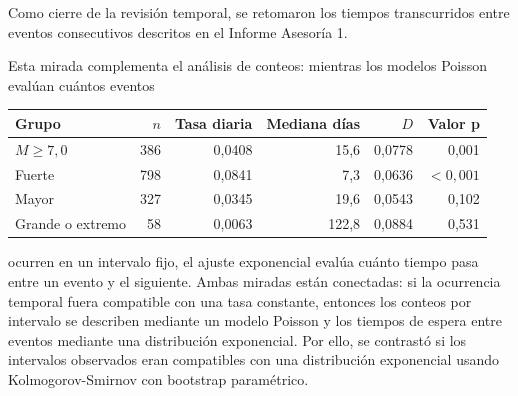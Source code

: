 \documentclass[
  spanish,
  letterpaper,
  DIV=11,
  numbers=noendperiod]{scrartcl}
\begin{document}
\noindent
\begin{minipage}[t]{0.45\textwidth}
\vspace{0pt}
Como cierre de la revisión temporal, se retomaron los tiempos transcurridos entre eventos consecutivos descritos en el Informe Asesoría 1.

Esta mirada complementa el análisis de conteos: mientras los modelos Poisson evalúan cuántos eventos
\end{minipage}\hfill
\begin{minipage}[t]{0.51\textwidth}
\vspace{0pt}
\begingroup
\scriptsize
\centering
\setlength{\tabcolsep}{1.8pt}
\renewcommand{\arraystretch}{0.82}
{}
\label{tbl-temporal-exponencial}
\hypertarget{dest-tbl-temporal-exponencial}{}
\begin{tabular*}{\linewidth}{@{\extracolsep{\fill}}lrrrrr@{}}
\toprule
Grupo & $n$ & Tasa diaria & Mediana días & $D$ & Valor p \\
\midrule
$M \geq 7{,}0$ & 386 & 0,0408 & 15,6 & 0,0778 & 0,001 \\
Fuerte & 798 & 0,0841 & 7,3 & 0,0636 & $<0{,}001$ \\
Mayor & 327 & 0,0345 & 19,6 & 0,0543 & 0,102 \\
Grande o extremo & 58 & 0,0063 & 122,8 & 0,0884 & 0,531 \\
\bottomrule
\end{tabular*}
\par\vspace{0.10em}
\endgroup
\end{minipage}
\par\vspace{-0.25em}

ocurren en un intervalo fijo, el ajuste exponencial evalúa cuánto tiempo
pasa entre un evento y el siguiente. Ambas miradas están conectadas: si
la ocurrencia temporal fuera compatible con una tasa constante, entonces
los conteos por intervalo se describen mediante un modelo Poisson y los
tiempos de espera entre eventos mediante una distribución exponencial.
Por ello, se contrastó si los intervalos observados eran compatibles con
una distribución exponencial usando Kolmogorov-Smirnov con bootstrap
paramétrico.
\end{document}
